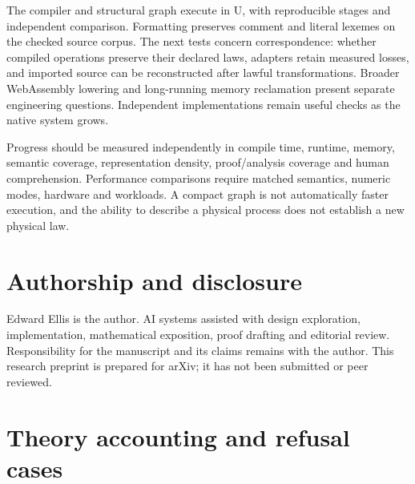 \documentclass[11pt]{article}
\theoremstyle{remark}
\begin{document}
The compiler and structural graph execute in U, with reproducible stages and
independent comparison. Formatting preserves comment and literal lexemes on
the checked source corpus. The next tests concern correspondence: whether
compiled operations preserve their declared laws, adapters retain measured
losses, and imported source can be reconstructed after lawful transformations.
Broader WebAssembly lowering and long-running memory reclamation present
separate engineering questions. Independent implementations remain useful
checks as the native system grows.

Progress should be measured independently in compile time, runtime,
memory, semantic coverage, representation density, proof/analysis coverage
and human comprehension. Performance comparisons require matched semantics,
numeric modes, hardware and workloads. A compact graph is not automatically
faster execution, and the ability to describe a physical process does not
establish a new physical law.

\section*{Authorship and disclosure}
Edward Ellis is the author. AI systems assisted with design exploration,
implementation, mathematical exposition, proof drafting and editorial review.
Responsibility for the manuscript and its claims remains with the author.
This research preprint is prepared for arXiv; it has not been submitted or
peer reviewed.

\appendix
\section{Theory accounting and refusal cases}
\label{app:theories}
\end{document}
